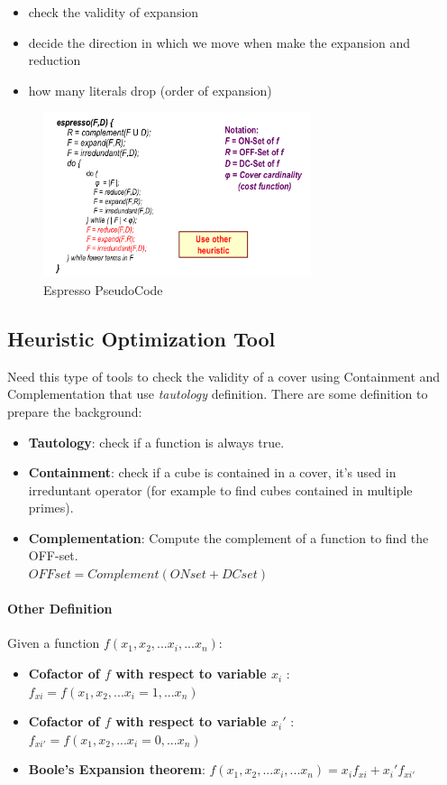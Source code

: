 \begin{itemize}
	\item check the validity of expansion
	\item decide the direction in which we move when make the expansion and reduction  
	\item how many literals drop (order of expansion)
\end{itemize}

\begin{figure}[H]
	\centering
	\includegraphics[width=0.7\textwidth]{./Cap6/Images/Image12.png}
	\caption{Espresso PseudoCode}
	\label{fig:espressopseudo}
\end{figure}

\subsection{Heuristic Optimization Tool}

Need this type of tools to check the validity of a cover using Containment and Complementation that use \textit{tautology} definition. There are some definition to prepare the background:

\begin{itemize}
	\item \textbf{Tautology}: check if a function is always true.
	\item \textbf{Containment}: check if a cube is contained in a cover, it's used in irreduntant operator (for example to find cubes contained in multiple primes).
	\item \textbf{Complementation}: Compute the complement of a function to find the OFF-set.\\  $OFFset = Complement( ONset + DCset )$ 
\end{itemize}

\paragraph{Other Definition} Given a function $f(x_{1}, x_{2},...x_{i},... x_{n})$:
\begin{itemize}
	\item \textbf{Cofactor of $f$ with respect to variable $x_{i}$ }: $f_{xi} = f(x_{1}, x_{2},...x_{i}=1,... x_{n})$
	\item \textbf{Cofactor of $f$ with respect to variable $x_{i}'$ }: $f_{xi'} = f(x_{1}, x_{2},...x_{i}=0,... x_{n})$
	\item \textbf{Boole's Expansion theorem}: $f(x_{1}, x_{2},...x_{i},... x_{n}) = x_{i}f_{xi}+x_{i}'f_{xi'} $
\end{itemize}

